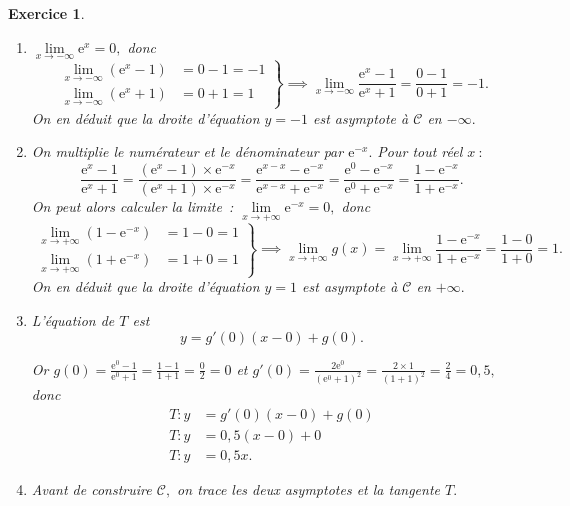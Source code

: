 \documentclass[10pt]{article}
\newtheorem{exo}{Exercice}
\begin{document}
\begin{exo}
\begin{enumerate}
\medskip
\begin{center}
\end{center}
\item $\lim\limits_{x\to -\infty}\text{e}^{x}= 0,$ donc 
\[
\left.
    \begin{array}{ll}
        \lim\limits_{x\to -\infty}\left(\text{e}^{x}-1\right)&= 0-1=-1 \\
        \lim\limits_{x\to -\infty}\left(\text{e}^{x}+1\right)&= 0+1=1
    \end{array}
\right \}\implies \lim\limits_{x\to -\infty}\frac{\text{e}^{x}-1}{\text{e}^{x}+1}=\frac{0-1}{0+1}=-1.
\]
On en déduit que la droite d'équation $y=-1$ est asymptote à $\mathcal{C}$ en $-\infty.$
\item On multiplie le numérateur et le dénominateur par $\text{e}^{-x}.$ Pour tout réel $x~:$
\[
\frac{\text{e}^{x}-1}{\text{e}^x+1}
=\frac{\left(\text{e}^{x}-1\right)\times\text{e}^{-x}}{\left(\text{e}^{x}+1\right)\times\text{e}^{-x}}
=\frac{\text{e}^{x-x}-\text{e}^{-x}}{\text{e}^{x-x}+\text{e}^{-x}}
=\frac{\text{e}^{0}-\text{e}^{-x}}{\text{e}^{0}+\text{e}^{-x}}
=\frac{1-\text{e}^{-x}}{1+\text{e}^{-x}}.
\]
On peut alors calculer la limite~: $\lim\limits_{x\to +\infty}\text{e}^{-x}= 0,$ donc 
\[
\left.
    \begin{array}{ll}
        \lim\limits_{x\to +\infty}\left(1-\text{e}^{-x}\right)&= 1-0=1 \\
        \lim\limits_{x\to +\infty}\left(1+\text{e}^{-x}\right)&= 1+0=1
    \end{array}
\right \}\implies \lim\limits_{x\to +\infty}g(x)=\lim\limits_{x\to +\infty}\frac{1-\text{e}^{-x}}{1+\text{e}^{-x}}=\frac{1-0}{1+0}=1.
\]
On en déduit que la droite d'équation $y=1$ est asymptote à $\mathcal{C}$ en $+\infty.$

\item L'équation de $T$ est \[y=g'(0)(x-0)+g(0).\]

Or $g(0)=\frac{\text{e}^{0}-1}{\text{e}^{0}+1}=\frac{1-1}{1+1}=\frac{0}{2}=0$ et $g'(0)=\frac{2\text{e}^{0}}{\left(\text{e}^{0}+1\right)^2}=\frac{2\times 1}{\left(1+1\right)^2}=\frac{2}{4}=0,5,$ donc 
\begin{align*}
T:y&=g'(0)(x-0)+g(0)\\
T:y&=0,5(x-0)+0\\
T:y&=0,5x.\end{align*}
\item Avant de construire $\mathcal{C},$ on trace les deux asymptotes et la tangente $T.$



\end{enumerate}
\end{exo}
\end{document}
